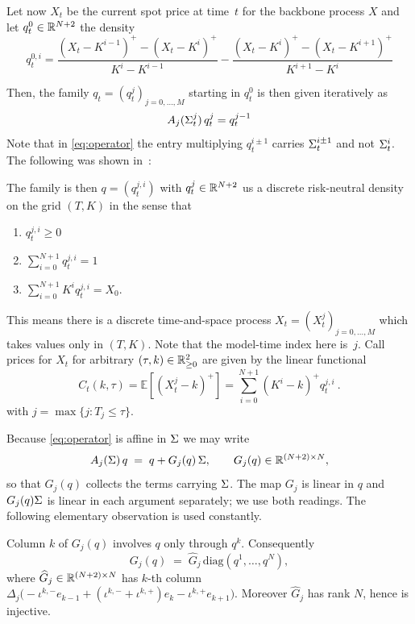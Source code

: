 Let now $X_t$ be the current spot price at time~$t$ for the backbone process $X$ and let $q_t^0\in\mathbb R^{N+2}$
the density
$$
  q^{0,i}_t = \frac{  ( X_t - K^{i-1} )^+ - ( X_t - K^{i} )^+ }{ K^{i} - K^{i-1} } - \frac{ ( X_t - K^i )^+ - ( X_t - K^{i+1} )^+   }{ K^{i+1} - K^{i} } 
$$


Then, the family $q_t=(q_t^j)_{j=0,\dots,M}$ starting in $q_t^0$ is then given iteratively as
\begin{equation}
A_j(\Sigma^j_t)\,q^j_t=q^{j-1}_t
\end{equation}
Note that in \eqref{eq:operator} the entry multiplying $q^{i\pm1}_t$ carries
$\Sigma^{i\pm1}_t$ and not $\Sigma^i_t$. The following was shown in~\cite{BuehlerRyskin2016}:

\begin{theorem}
The family is then $q=(q^{j,i}_t)$ with $q^j_t\in\mathbb R^{N+2}$ us a discrete risk-neutral density on the grid $(T,K)$
in the sense that
\begin{enumerate}
  \item $q^{j,i}_t \geq 0$
  \item $\sum_{i=0}^{N+1} q^{j,i}_t = 1$
  \item $\sum_{i=0}^{N+1} K^i q^{j,i}_t = X_0$.
\end{enumerate}
This means there is a discrete time-and-space process $X_t=(X_t^j)_{j=0,\dots,M}$ which takes values only in $(T,K)$. Note that
the model-time index here is~$j$.
Call prices for $X_t$ for arbitrary $(\tau,k)\in\mathbb R_{\geq 0}^2$ are given by the linear functional
\begin{equation}\label{eq:Xcall}
  C_t(k,\tau)=\mathbb{E}\left[ \left( X_t^j - k \right)^+ \right] = \sum_{i=0}^{N+1} ( K^i - k )^+ q^{j,i}_t \ .
\end{equation}
with $j=\max\{j: T_j\leq \tau\}$.
\end{theorem}








Because \eqref{eq:operator} is affine in $\Sigma$ we may write
\begin{equation}\label{eq:affine}
  A_j(\Sigma)\,q\;=\;q+G_j(q)\,\Sigma,\qquad G_j(q)\in\mathbb R^{(N+2)\times N},
\end{equation}
so that $G_j(q)$ collects the terms carrying $\Sigma$. The map $G_j$ is linear in
$q$ and $G_j(q)\Sigma$ is linear in each argument separately; we use both
readings. The following elementary observation is used constantly.

\begin{lemma}[Factorisation]\label{lem:factor}
Column $k$ of $G_j(q)$ involves $q$ only through $q^k$. Consequently
\begin{equation}\label{eq:factor}
  G_j(q)\;=\;\widehat G_j\,\mathrm{diag}(q^1,\dots,q^N),
\end{equation}
where $\widehat G_j\in\mathbb R^{(N+2)\times N}$ has $k$-th column
$\Delta_j\bigl(-\iota^{k,-} e_{k-1}+(\iota^{k,-}+\iota^{k,+})e_k-\iota^{k,+} e_{k+1}\bigr)$.
Moreover $\widehat G_j$ has rank $N$, hence is injective.
\end{lemma}

